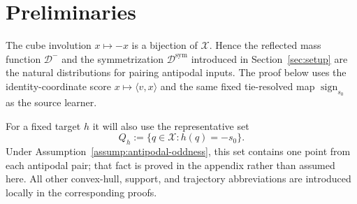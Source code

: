 \section{Preliminaries}
\label{sec:preliminaries}

The cube involution $x\mapsto -x$ is a bijection of $\mathcal X$.  Hence the
reflected mass function $\mathcal D^-$ and the symmetrization
$\mathcal D^{\mathrm{sym}}$ introduced in Section~\ref{sec:setup} are the
natural distributions for pairing antipodal inputs.  The proof below uses the
identity-coordinate score $x\mapsto\langle v,x\rangle$ and the same fixed
tie-resolved map $\operatorname{sign}_{s_0}$ as the source learner.

For a fixed target $h$ it will also use the representative set
\[
 Q_h:=\{q\in\mathcal X:h(q)=-s_0\}.
\]
Under Assumption~\ref{assump:antipodal-oddness}, this set contains one point
from each antipodal pair; that fact is proved in the appendix rather than
assumed here.  All other convex-hull, support, and trajectory abbreviations
are introduced locally in the corresponding proofs.
